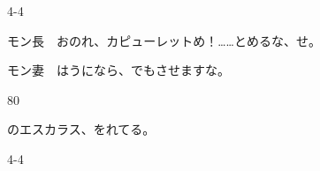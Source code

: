 \documentclass[tate,paper=b6j,jafontsize=9pt]{jlreq}
\begin{document}
\begin{azconvIndented}{4\zw}{-4\zw}

モン長　おのれ、カピューレットめ！……とめるな、せ。

モン妻　はうになら、でもさせますな。

\end{azconvIndented}
\begin{azconvIndented}{8\zw}{0\zw}

のエスカラス、をれてる。

\end{azconvIndented}
\begin{azconvIndented}{4\zw}{-4\zw}


\end{azconvIndented}
\end{document}

